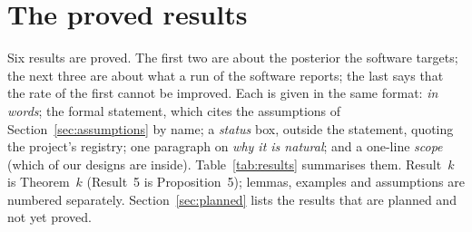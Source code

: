\section{The proved results}\label{sec:proved}\label{sec:results}

Six results are proved. The first two are about the posterior the software targets; the next three are about what a run
of the software reports; the last says that the rate of the first cannot be improved. Each is given in the same
format: \emph{in words}; the formal statement, which cites the assumptions of Section~\ref{sec:assumptions} by name; a
\emph{status} box, outside the statement, quoting the project's registry; one paragraph on \emph{why it is natural}; and
a one-line \emph{scope} (which of our designs are inside). Table~\ref{tab:results} summarises them. Result~$k$ is
Theorem~$k$ (Result~5 is Proposition~5); lemmas, examples and assumptions are numbered separately.
Section~\ref{sec:planned} lists the results that are planned and not yet proved.

\newcommand{\whynat}[1]{\par\noindent\textit{Why it is natural.} #1\par\smallskip}
\newcommand{\vssl}[1]{\par\noindent\textit{Compared with \SL.} #1\par\smallskip}

